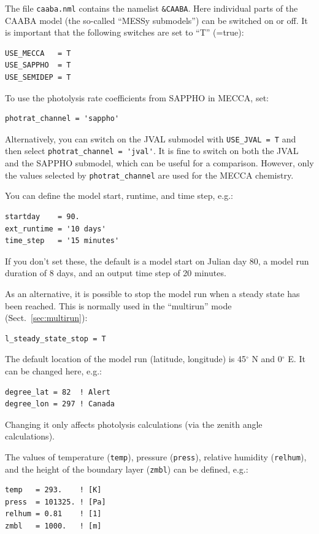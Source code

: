 \documentclass[twoside]{article}
\begin{document}
The file \verb|caaba.nml| contains the namelist \verb|&CAABA|. Here
individual parts of the CAABA model (the so-called ``MESSy submodels'')
can be switched on or off. It is important that the following switches
are set to ``T'' (=true):
\begin{verbatim}
USE_MECCA   = T
USE_SAPPHO  = T
USE_SEMIDEP = T
\end{verbatim}
To use the photolysis rate coefficients from SAPPHO in MECCA, set:
\begin{verbatim}
photrat_channel = 'sappho'
\end{verbatim}
Alternatively, you can switch on the JVAL submodel with
\verb|USE_JVAL = T| and then select \verb|photrat_channel = 'jval'|. It
is fine to switch on both the JVAL and the SAPPHO submodel, which can be
useful for a comparison. However, only the values selected by
\verb|photrat_channel| are used for the MECCA chemistry.

You can define the model start, runtime, and time step, e.g.:
\begin{verbatim}
startday    = 90.
ext_runtime = '10 days'
time_step   = '15 minutes'
\end{verbatim}
If you don't set these, the default is a model start on Julian day 80, a
model run duration of 8 days, and an output time step of 20 minutes.

As an alternative, it is possible to stop the model run when a steady
state has been reached. This is normally used in the ``multirun'' mode
(Sect.~\ref{sec:multirun}):

\begin{verbatim}
l_steady_state_stop = T
\end{verbatim}

The default location of the model run (latitude, longitude) is
45$^\circ$ N and 0$^\circ$ E. It can be changed here, e.g.:

\begin{verbatim}
degree_lat = 82  ! Alert
degree_lon = 297 ! Canada
\end{verbatim}

Changing it only affects photolysis calculations (via the zenith angle
calculations).

The values of temperature (\verb|temp|), pressure (\verb|press|),
relative humidity (\verb|relhum|), and the height of the boundary layer
(\verb|zmbl|) can be defined, e.g.:

\begin{verbatim}
temp   = 293.    ! [K]
press  = 101325. ! [Pa]
relhum = 0.81    ! [1]
zmbl   = 1000.   ! [m]
\end{verbatim}
\end{document}
